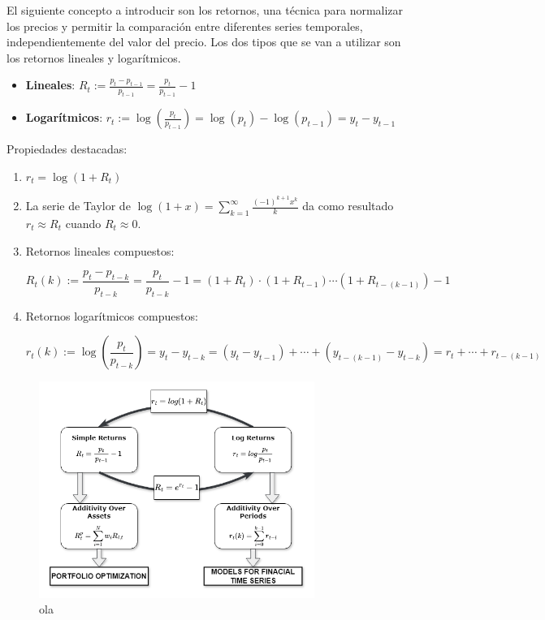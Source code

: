 \documentclass[a4paper,12pt]{report}
\begin{document}
El siguiente concepto a introducir son los retornos, una técnica para normalizar los precios y permitir la comparación 
entre diferentes series temporales, independientemente del valor del precio. Los dos tipos que se van a utilizar son 
los retornos lineales y logarítmicos.

\begin{itemize}
    \item \textbf{Lineales}: $R_t := \frac{p_t - p_{t-1}}{p_{t-1}} = \frac{p_t}{p_{t-1}} - 1$
    \item \textbf{Logarítmicos}: $r_t := \log\left(\frac{p_t}{p_{t-1}}\right) = \log(p_t) - \log(p_{t-1}) = y_t - y_{t-1}$
\end{itemize}

Propiedades destacadas:

\begin{enumerate}
    \item $r_t = \log(1 + R_t)$
    \item La serie de Taylor de $\log(1 + x) = \sum_{k=1}^{\infty} \frac{(-1)^{k+1} x^k}{k}$ da como resultado $r_t 
    \approx R_t$ cuando $R_t \approx 0$.
    \item Retornos lineales compuestos:

    \[
    R_t(k) := \frac{p_t - p_{t-k}}{p_{t-k}} = \frac{p_t}{p_{t-k}} - 1 = \left(1 + R_t\right) \cdot \left(1 + R_{t-1}\right) 
    \cdots \left(1 + R_{t-(k-1)}\right) - 1
    \]

    \item Retornos logarítmicos compuestos:

    \[
    r_t(k) := \log\left(\frac{p_t}{p_{t-k}}\right) = y_t - y_{t-k} = (y_t - y_{t-1}) + \cdots + (y_{t-(k-1)} - 
    y_{t-k}) = r_t + \cdots + r_{t-(k-1)}
    \]
\end{enumerate}




\begin{figure}[H]
    \centering
    \includegraphics[width=0.8\textwidth]{figures/simple_and_log_ret_relation.png}
    \caption{ola}
    \label{fig:log-returns}
\end{figure}
\end{document}
